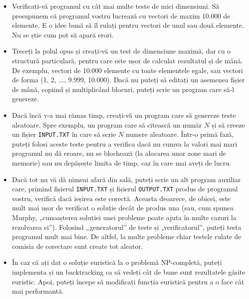 \begin{itemize}

\item Verificați-vă programul cu cât mai multe teste de mici dimensiuni. Să
  presupunem că programul vostru lucrează cu vectori de maxim 10.000 de
  elemente. E o idee bună să îl rulați pentru vectori de unul sau două
  elemente. Nu se știe cum pot să apară erori.

\item Treceți la polul opus și creați-vă un test de dimensiune maximă, dar cu
  o structură particulară, pentru care este ușor de calculat rezultatul și de
  mână. De exemplu, vectori de 10.000 elemente cu toate elementele egale, sau
  vectori de forma (1, 2, ..., 9.999, 10.000). Dacă nu puteți să editați un
  asemenea fișier de mână, copiind și multiplicând blocuri, puteți scrie un
  program care să-l genereze.

\item Dacă încă v-a mai rămas timp, creați-vă un program care să genereze
  teste aleatoare. Spre exemplu, un program care să citească un număr $N$ și
  să creeze un fișier {\tt INPUT.TXT} în care să scrie $N$ numere
  aleatoare. Într-o primă fază, puteți folosi aceste teste pentru a verifica
  dacă nu cumva la valori mai mari programul nu dă eroare, nu se blochează (la
  alocarea unor zone mari de memorie) sau nu depășește limita de timp, caz în
  care mai aveți de lucru.
  
\item Dacă tot nu vă dă nimeni afară din sală, puteți scrie un alt program
  auxiliar care, primind fișierul {\tt INPUT.TXT} și fișierul {\tt OUTPUT.TXT}
  produs de programul vostru, verifică dacă ieșirea este corectă. Aceasta
  deoarece, de obicei, este mult mai ușor de verificat o soluție decât de
  produs una (sau, cum spunea Murphy, „cunoașterea soluției unei probleme
  poate ajuta în multe cazuri la rezolvarea ei”). Folosind „generatorul” de
  teste și „verificatorul”, puteți testa programul mult mai bine. De altfel,
  la multe probleme chiar testele rulate de comisia de corectare sunt create
  tot aleator.

\item În caz că ați dat o soluție euristică la o problemă NP-completă, puteți
  implementa și un backtracking ca să vedeți cât de bune sunt rezultatele
  găsite euristic. Apoi, puteți începe să modificați funcția euristică pentru
  a o face cât mai performantă.

\end{itemize}

